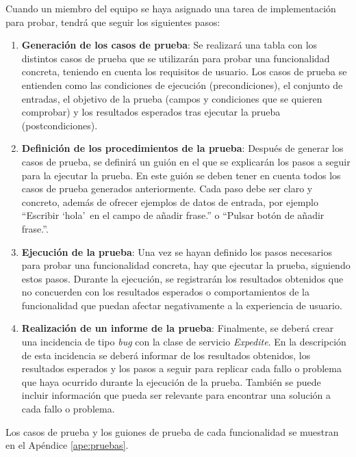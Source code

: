 Cuando un miembro del equipo se haya asignado una tarea de implementación para probar, tendrá que seguir los siguientes pasos:
\begin{enumerate}
    \item \textbf{Generación de los casos de prueba}: Se realizará una tabla con los distintos casos de prueba que se utilizarán para probar una funcionalidad concreta, teniendo en cuenta los requisitos de usuario. Los casos de prueba se entienden como las condiciones de ejecución (precondiciones), el conjunto de entradas, el objetivo de la prueba (campos y condiciones que se quieren comprobar) y los resultados esperados tras ejecutar la prueba (postcondiciones).
    \item \textbf{Definición de los procedimientos de la prueba}: Después de generar los casos de prueba, se definirá un guión en el que se explicarán los pasos a seguir para la ejecutar la prueba. En este guión se deben tener en cuenta todos los casos de prueba generados anteriormente. Cada paso debe ser claro y concreto, además de ofrecer ejemplos de datos de entrada, por ejemplo ``Escribir `hola'\, en el campo de añadir frase.'' o ``Pulsar botón de añadir frase.''.
    \item \textbf{Ejecución de la prueba}: Una vez se hayan definido los pasos necesarios para probar una funcionalidad concreta, hay que ejecutar la prueba, siguiendo estos pasos. Durante la ejecución, se registrarán los resultados obtenidos que no concuerden con los resultados esperados o comportamientos de la funcionalidad que puedan afectar negativamente a la experiencia de usuario.
    \item \textbf{Realización de un informe de la prueba}: Finalmente, se deberá crear una incidencia de tipo \textit{bug} con la clase de servicio \textit{Expedite}. En la descripción de esta incidencia se deberá informar de los resultados obtenidos, los resultados esperados y los pasos a seguir para replicar cada fallo o problema que haya ocurrido durante la ejecución de la prueba. También se puede incluir información que pueda ser relevante para encontrar una solución a cada fallo o problema.
\end{enumerate}

Los casos de prueba y los guiones de prueba de cada funcionalidad se muestran en el Apéndice \ref{ape:pruebas}.